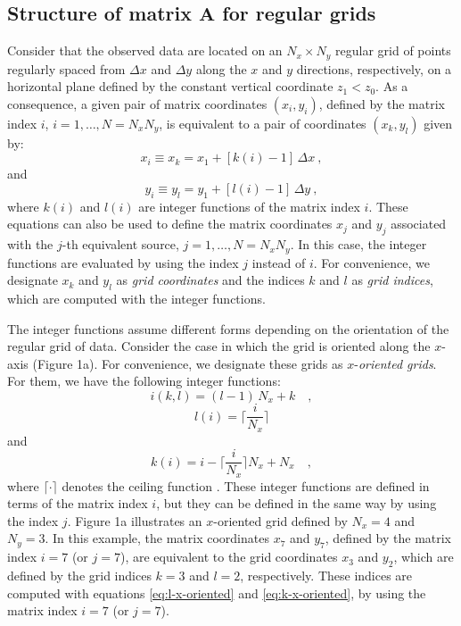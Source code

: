 \subsection{Structure of matrix $\mathbf{A}$ for regular grids}

Consider that the observed data are located on an $N_{x} \times N_{y}$ regular grid of
points regularly spaced from $\Delta x$ and $\Delta y$ along the $x$ and $y$ directions,
respectively, on a horizontal plane defined by the constant vertical coordinate $z_{1} < z_{0}$. 
As a consequence, a given pair of matrix coordinates $(x_{i}, y_{i})$, defined by the matrix index 
$i$, $i = 1, \dots, N = N_{x} N_{y}$, is equivalent to a pair of coordinates $(x_{k}, y_{l})$
given by:
\begin{equation}
x_{i} \equiv x_{k} = x_{1} + \left[ k(i) - 1 \right] \, \Delta x \: , 
\label{eq:xi}
\end{equation}
and
\begin{equation}
y_{i} \equiv y_{l} = y_{1} + \left[ l(i) - 1 \right] \, \Delta y \: ,
\label{eq:yi}
\end{equation}
where $k(i)$ and $l(i)$ are integer functions of the matrix index $i$.
These equations can also be used to define the matrix coordinates 
$x_{j}$ and $y_{j}$ associated with the $j$-th equivalent source,
$j = 1, \dots, N = N_{x}N_{y}$. In this case, the integer functions
are evaluated by using the index $j$ instead of $i$.
For convenience, we designate $x_{k}$ and $y_{l}$ as \textit{grid coordinates}
and the indices $k$ and $l$ as \textit{grid indices}, which are computed with
the integer functions.

The integer functions assume different forms depending on the 
orientation of the regular grid of data.
Consider the case in which the grid is oriented along the
$x$-axis (Figure 1a). For convenience, we designate these grids as 
$x$-\textit{oriented grids}. For them, we have the following integer functions:
\begin{equation}
i(k, l) = (l - 1) \, N_{x} + k \quad ,
\label{eq:i-x-oriented}
\end{equation}
\begin{equation}
l(i) = \Bigg\lceil \frac{i}{N_{x}} \Bigg\rceil
\label{eq:l-x-oriented}
\end{equation}
and
\begin{equation}
k(i)  = i - \Bigg\lceil \frac{i}{N_{x}} \Bigg\rceil N_{x} + N_{x} \quad ,
\label{eq:k-x-oriented}
\end{equation}
where $\lceil \cdot \rceil$ denotes the ceiling function \citep[][ p. 67]{graham-etal1994}.
These integer functions are defined in terms of the matrix index $i$, but they can 
be defined in the same way by using the index $j$.
Figure 1a illustrates an $x$-oriented grid defined by $N_{x} = 4$ and $N_{y} = 3$.
In this example, the matrix coordinates $x_{7}$ and $y_{7}$, defined by the matrix index $i = 7$ (or $j = 7$), 
are equivalent to the grid coordinates $x_{3}$ and $y_{2}$, which are defined by the grid indices
$k = 3$ and $l = 2$, respectively. These indices are computed with equations \ref{eq:l-x-oriented}
and \ref{eq:k-x-oriented}, by using the matrix index $i = 7$ (or $j = 7$).

